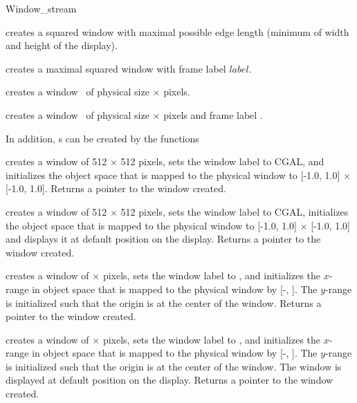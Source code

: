 \begin{ccClass} {Window_stream}

\ccCreation
{}
{creates a squared window with maximal possible edge length
(minimum of width and height of the display).}

{creates a maximal squared window with frame label $label$.}

{creates a window \ccVar\ of physical size  $\times$  pixels.}


{creates a window \ccVar\ of physical size  $\times$  pixels 
and frame label .}

In addition, \ccClassName s can be created by the functions

{creates a window of 512 $\times$ 512 pixels, sets the window label to
CGAL, and  initializes the object space that is mapped to the physical window to
[-1.0, 1.0] $\times$ [-1.0, 1.0]. 
Returns a pointer to the window created.}

{creates a window of 512 $\times$ 512 pixels, sets the window label to
CGAL, initializes the object space that is mapped to the physical window to 
[-1.0, 1.0] $\times$ [-1.0, 1.0] and 
displays it at default position on the display. Returns a pointer to the window created.}

{creates a window of  $\times$  pixels, sets the window label to
, and  initializes the $x$-range in object space that is mapped to the physical window by
[-, ]. The $y$-range is initialized such that the origin is at
the center of the window. 
Returns a pointer to the window created.}

{creates a window of  $\times$  pixels, sets the window label to
, and initializes the $x$-range in object space that is mapped to the physical window by
[-, ]. The $y$-range is initialized such that the origin is at
the center of the window. The window is displayed at default position on the display. 
Returns a pointer to the window created.}


\end{ccClass}
